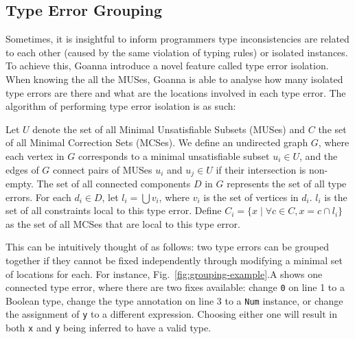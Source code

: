 \documentclass[pdflatex,sn-mathphys-num]{sn-jnl}%
\begin{document}

   
\subsection{Type Error Grouping} \label{sub:grouping}

Sometimes, it is insightful to inform programmers type inconsistencies are related to each other (caused by the same violation of typing rules) or isolated instances. To achieve this, Goanna introduce a novel feature called type error isolation. When knowing the all the MUSes, Goanna is able to analyse how many isolated type errors are there and what are the locations involved in each type error. The algorithm of performing type error isolation is as such:


	Let $U$ denote the set of all Minimal Unsatisfiable Subsets (MUSes) and $C$ the set of all Minimal Correction Sets (MCSes). We define an undirected graph $G$, where each vertex in $G$ corresponds to a minimal unsatisfiable subset $u_i \in U$, and the edges of $G$ connect pairs of MUSes $u_i$ and $u_j \in U$ if their intersection is non-empty. The set of all connected components $D$ in $G$ represents the set of all type errors. For each $d_i \in D$, let $l_i = \bigcup v_i$, where $v_i$ is the set of vertices in $d_i$. $l_i$ is the set of all constraints local to this type error. Define $C_i = \{ x \mid \forall c \in C, x = c \cap l_i \}$ as the set of all MCSes that are local to this type error.


    This can be intuitively thought of as follows: two type errors can be grouped together if they cannot be fixed independently through modifying a minimal set of locations for each. For instance, Fig.~\ref{fig:grouping-example}.A shows one connected type error, where there are two fixes available: change \texttt{0} on line 1 to a Boolean type, change the type annotation on line 3 to a \texttt{Num} instance, or change the assignment of \texttt{y} to a different expression. Choosing either one will result in both \texttt{x} and \texttt{y} being inferred to have a valid type.
    
\end{document}
